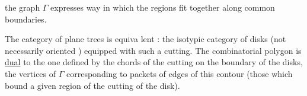  the graph $\Gamma$ expresses  way in which the regions fit together along common boundaries.

The category of plane trees  is equiva\unsure{-}\linebreak
lent : the isotypic category of disks  (not necessarily oriented ) equipped with such a cutting. The combinatorial polygon  %
 is \uline{dual} to the one defined by the chords of the cutting on the boundary of the disks, the vertices of $\Gamma$ corresponding to packets of edges of this contour (those which bound a given region of the cutting  of the disk).
